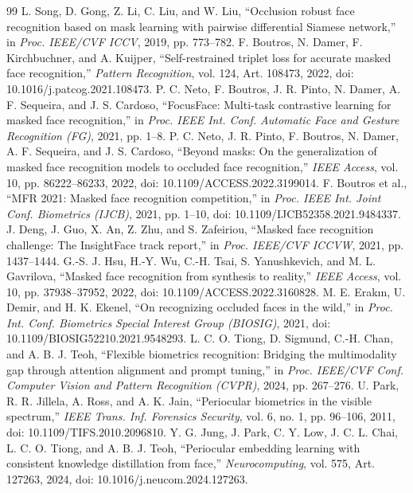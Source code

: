 \documentclass[10pt,lettersize,journal]{IEEEtran}
\begin{document}
\begin{thebibliography}{99}
 L. Song, D. Gong, Z. Li, C. Liu, and W. Liu, ``Occlusion robust face recognition based on mask learning with pairwise differential Siamese network,'' in \textit{Proc. IEEE/CVF ICCV}, 2019, pp. 773--782.
 F. Boutros, N. Damer, F. Kirchbuchner, and A. Kuijper, ``Self-restrained triplet loss for accurate masked face recognition,'' \textit{Pattern Recognition}, vol. 124, Art. 108473, 2022, doi: 10.1016/j.patcog.2021.108473.
 P. C. Neto, F. Boutros, J. R. Pinto, N. Damer, A. F. Sequeira, and J. S. Cardoso, ``FocusFace: Multi-task contrastive learning for masked face recognition,'' in \textit{Proc. IEEE Int. Conf. Automatic Face and Gesture Recognition (FG)}, 2021, pp. 1--8.
 P. C. Neto, J. R. Pinto, F. Boutros, N. Damer, A. F. Sequeira, and J. S. Cardoso, ``Beyond masks: On the generalization of masked face recognition models to occluded face recognition,'' \textit{IEEE Access}, vol. 10, pp. 86222--86233, 2022, doi: 10.1109/ACCESS.2022.3199014.
 F. Boutros et al., ``MFR 2021: Masked face recognition competition,'' in \textit{Proc. IEEE Int. Joint Conf. Biometrics (IJCB)}, 2021, pp. 1--10, doi: 10.1109/IJCB52358.2021.9484337.
 J. Deng, J. Guo, X. An, Z. Zhu, and S. Zafeiriou, ``Masked face recognition challenge: The InsightFace track report,'' in \textit{Proc. IEEE/CVF ICCVW}, 2021, pp. 1437--1444.
 G.-S. J. Hsu, H.-Y. Wu, C.-H. Tsai, S. Yanushkevich, and M. L. Gavrilova, ``Masked face recognition from synthesis to reality,'' \textit{IEEE Access}, vol. 10, pp. 37938--37952, 2022, doi: 10.1109/ACCESS.2022.3160828.
 M. E. Erakın, U. Demir, and H. K. Ekenel, ``On recognizing occluded faces in the wild,'' in \textit{Proc. Int. Conf. Biometrics Special Interest Group (BIOSIG)}, 2021, doi: 10.1109/BIOSIG52210.2021.9548293.
 L. C. O. Tiong, D. Sigmund, C.-H. Chan, and A. B. J. Teoh, ``Flexible biometrics recognition: Bridging the multimodality gap through attention alignment and prompt tuning,'' in \textit{Proc. IEEE/CVF Conf. Computer Vision and Pattern Recognition (CVPR)}, 2024, pp. 267--276.
 U. Park, R. R. Jillela, A. Ross, and A. K. Jain, ``Periocular biometrics in the visible spectrum,'' \textit{IEEE Trans. Inf. Forensics Security}, vol. 6, no. 1, pp. 96--106, 2011, doi: 10.1109/TIFS.2010.2096810.
 Y. G. Jung, J. Park, C. Y. Low, J. C. L. Chai, L. C. O. Tiong, and A. B. J. Teoh, ``Periocular embedding learning with consistent knowledge distillation from face,'' \textit{Neurocomputing}, vol. 575, Art. 127263, 2024, doi: 10.1016/j.neucom.2024.127263.

\end{thebibliography}
\end{document}
